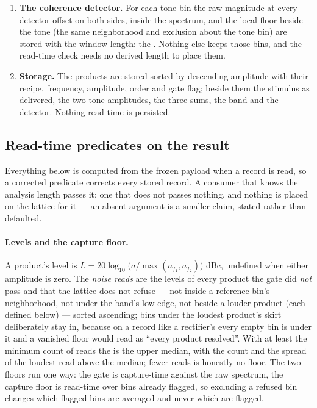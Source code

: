 \documentclass[11pt,a4paper]{article}
\begin{document}
{\begin{enumerate}
\item \textbf{The coherence detector.} For each tone bin the raw
magnitude at every detector offset on both sides, inside the spectrum, and
the local floor beside the tone (the same neighborhood and exclusion
about the tone bin) are stored with the window length: the
. Nothing else keeps those bins, and the read-time
check needs no derived length to place them.

\item \textbf{Storage.} The products are stored sorted by descending
amplitude with their recipe, frequency, amplitude, order and gate flag;
beside them the stimulus as delivered, the two tone amplitudes, the three
sums, the band and the detector. Nothing read-time is persisted.
\end{enumerate}
\par}

\subsection{Read-time predicates on the result}
\label{sec:imd-predicates}
Everything below is computed from the frozen payload when a record is
read, so a corrected predicate corrects every stored record. A consumer
that knows the analysis length passes it; one that does not passes
nothing, and nothing is placed on the lattice for it --- an absent
argument is a smaller claim, stated rather than defaulted.

\paragraph{Levels and the capture floor.}
A product's level is $L = 20\log_{10}\big(a/\max(a_{f_1}, a_{f_2})\big)$
dBc, undefined when either amplitude is zero. The \emph{noise reads} are
the levels of every product the gate did \emph{not} pass and that the
lattice does not refuse --- not inside a reference bin's neighborhood,
not under the band's low edge, not beside a louder product (each defined
below) --- sorted ascending; bins under the loudest product's skirt
deliberately stay in, because on a record like a rectifier's every empty
bin is under it and a vanished floor would read as ``every product
resolved''. With at least the minimum count of reads the
 is the upper median, with the count and the spread
of the loudest read above the median; fewer reads is honestly no floor.
The two floors run one way: the gate is capture-time against the raw
spectrum, the capture floor is read-time over bins already flagged, so
excluding a refused bin changes which flagged bins are averaged and never
which are flagged.
\end{document}
